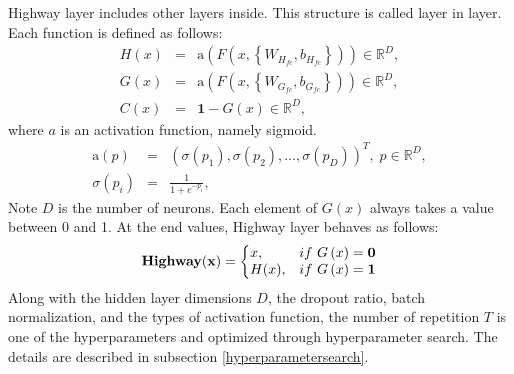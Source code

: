 \documentclass[proof]{pasj01}
\begin{document}
Highway layer includes other layers inside.  This structure is called layer in layer.  Each function is defined as follows: 
\begin{eqnarray}
    H \left(x\right) &=& \mathrm{a} \left( F \left(x, \left\{W_{H_{fc}}, b_{H_{fc}}\right\}\right) \right) \in \mathbb{R}^D, \\
    G \left(x\right) &=& \mathrm{a} \left( F \left(x, \left\{W_{G_{fc}}, b_{G_{fc}}\right\}\right) \right) \in \mathbb{R}^D, \\
    C \left(x\right) &=& \mathbf{1} - G \left(x\right) \in \mathbb{R}^D,
\end{eqnarray}
where $a$ is an activation function, namely sigmoid.
\begin{eqnarray*}
    \mathrm{a} \left(p\right) &=& \left( \sigma\left(p_1\right),\sigma\left(p_2\right), \ldots, \sigma\left(p_D\right) \right)^T, \; p \in \mathbb{R}^D, \\
    \sigma \left(p_i\right) &=& \frac{1}{1 + e^{-p_i}},
\end{eqnarray*}
Note $D$ is the number of neurons.  Each element of $G(x)$ always takes a value between 0 and 1.  At the end values, Highway layer behaves as follows:
\begin{equation}
    {\bf Highway(x)}=\left\{
    \begin{array}{@{}ll@{}}
      x, & \mathrm{if} \ G \left(x\right)= \mathbf{0} \\
      H(x), & \mathrm{if} \ G \left(x\right)= \mathbf{1} 
    \end{array}\right.
\end{equation}
Along with the hidden layer dimensions $D$, the dropout ratio, batch normalization, and the types of activation function, the number of repetition $T$ is one of the hyperparameters and optimized through hyperparameter search. The details are described in subsection \ref{hyperparametersearch}.
\end{document}
